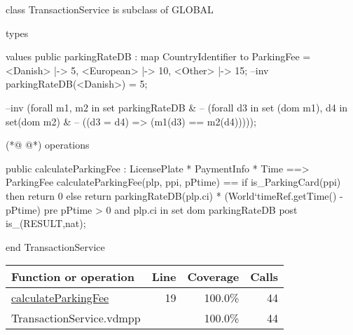 \begin{vdmpp}[breaklines=true]
class TransactionService is subclass of GLOBAL

types



values
public parkingRateDB : map CountryIdentifier to ParkingFee
     = {<Danish> |-> 5,
       <European> |-> 10,
       <Other> |-> 15};
--inv parkingRateDB(<Danish>) = 5;

--inv (forall m1, m2 in set parkingRateDB & 
--    (forall d3 in set (dom m1), d4 in set(dom m2) &
--   ((d3 = d4) => (m1(d3) == m2(d4)))));


(*@
\label{calculateParkingFee:19}
@*)
operations

public calculateParkingFee : LicensePlate * PaymentInfo * Time ==> ParkingFee
calculateParkingFee(plp, ppi, pPtime) ==
 if is_ParkingCard(ppi)
   then return 0
 else return parkingRateDB(plp.ci) * (World`timeRef.getTime() - pPtime)
pre pPtime > 0 and plp.ci in set dom parkingRateDB
post is_(RESULT,nat);
 

 

end TransactionService
\end{vdmpp}
\bigskip
\begin{longtable}{|l|r|r|r|}
\hline
Function or operation & Line & Coverage & Calls \\
\hline
\hline
\hyperref[calculateParkingFee:19]{calculateParkingFee} & 19&100.0\% & 44 \\
\hline
\hline
TransactionService.vdmpp & & 100.0\% & 44 \\
\hline
\end{longtable}

